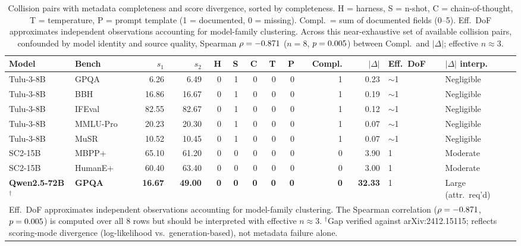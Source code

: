 \documentclass[11pt]{article}
\begin{document}
\begin{table}[t]
\centering
\caption{Collision pairs with metadata completeness and score
divergence, sorted by completeness. H = harness, S = n-shot,
C = chain-of-thought, T = temperature, P = prompt template
(1 = documented, 0 = missing). Compl.\ = sum of documented
fields (0--5). Eff.\ DoF approximates independent observations
accounting for model-family clustering. Across this
near-exhaustive set of available collision pairs, confounded by
model identity and source quality, Spearman $\rho = -0.871{}$
($n = 8$, $p = 0.005{}$) between Compl.\ and $|\Delta|$; effective
$n \approx 3$.}
\label{tab:attribution_extended}
\small
\setlength{\tabcolsep}{2.5pt}
\begin{tabular}{llrrrrrrrrrll}
\toprule
Model & Bench & $s_1$ & $s_2$ & H & S & C & T & P
  & Compl. & $|\Delta|$ & Eff.\ DoF & $|\Delta|$ interp. \\
\midrule
Tulu-3-8B & GPQA     &  6.26 &  6.49 & 0 & 1 & 0 & 0 & 0 & 1 &  0.23 & $\sim$1 & Negligible \\
Tulu-3-8B & BBH      & 16.86 & 16.67 & 0 & 1 & 0 & 0 & 0 & 1 &  0.19 & $\sim$1 & Negligible \\
Tulu-3-8B & IFEval   & 82.55 & 82.67 & 0 & 1 & 0 & 0 & 0 & 1 &  0.12 & $\sim$1 & Negligible \\
Tulu-3-8B & MMLU-Pro & 20.23 & 20.30 & 0 & 1 & 0 & 0 & 0 & 1 &  0.07 & $\sim$1 & Negligible \\
Tulu-3-8B & MuSR     & 10.52 & 10.45 & 0 & 1 & 0 & 0 & 0 & 1 &  0.07 & $\sim$1 & Negligible \\
SC2-15B   & MBPP+    & 65.10 & 61.20 & 0 & 0 & 0 & 0 & 0 & 0 &  3.90 & 1 & Moderate \\
SC2-15B   & HumanE+  & 60.40 & 63.40 & 0 & 0 & 0 & 0 & 0 & 0 &  3.00 & 1 & Moderate \\
\textbf{Qwen2.5-72B}$^\dagger$ & \textbf{GPQA}
  & \textbf{16.67} & \textbf{49.00}
  & \textbf{0} & \textbf{0} & \textbf{0} & \textbf{0} & \textbf{0}
  & \textbf{0} & \textbf{32.33} & 1 & Large (attr.\ req'd) \\
\bottomrule
\multicolumn{13}{p{0.97\columnwidth}}{\footnotesize Eff.\ DoF
  approximates independent observations accounting for model-family
  clustering. The Spearman correlation ($\rho = -0.871{}$, $p = 0.005{}$)
  is computed over all 8 rows but should be interpreted with effective
  $n \approx 3$. $^\dagger$Gap verified against arXiv:2412.15115;
  reflects scoring-mode divergence (log-likelihood vs.\
  generation-based), not metadata failure alone.}
\end{tabular}
\end{table}
\end{document}
